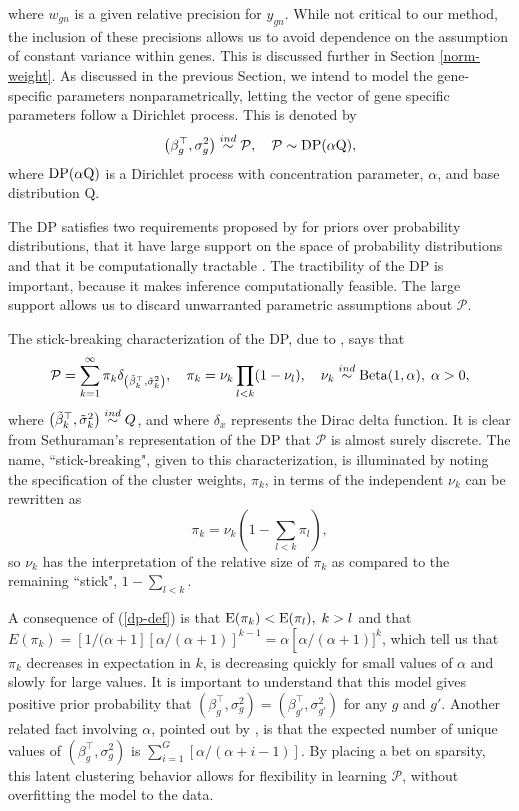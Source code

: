 where $w_{gn}$ is a given relative precision for $y_{gn}$. While not critical to our method, the inclusion of these precisions allows us to avoid dependence on the assumption of constant variance within genes. This is discussed further in Section \ref{norm-weight}. As discussed in the previous Section, we intend to model the gene-specific parameters nonparametrically, letting the vector of gene specific parameters follow a Dirichlet process. This is denoted by
\begin{equation}
\left(\beta_g^\top,\sigma^2_g\right) \stackrel{ind}{\sim} \mathcal{P},\quad \mathcal{P} \sim \operatorname{DP}(\alpha \mbox{Q}),
\end{equation}
where $\operatorname{DP}(\alpha \mbox{Q})$ is a Dirichlet process with concentration parameter, $\alpha$, and base distribution $\mbox{Q}$.

The DP satisfies two requirements proposed by \citet{ferguson} for priors over probability distributions, that it have large support on the space of probability distributions and that it be computationally tractable \citep{ferguson}. The tractibility of the DP is important, because it makes inference computationally feasible. The large support allows us to discard unwarranted parametric assumptions about $\mathcal{P}$.

The stick-breaking characterization of the DP, due to \citet{sethuraman}, says that 
\begin{equation}
\label{dp-def}
\mathcal{P} =\sum_{k=1}^\infty \pi_k \delta_{\left(\tilde{\beta}_k^\top ,\tilde{\sigma}^2_k\right)},\quad \pi_k = \nu_k \prod_{l<k}(1-\nu_l), \quad 
\nu_k \stackrel{ind}{\sim} \operatorname{Beta}(1, \alpha),\; \alpha>0,
\end{equation}
where $\left(\tilde{\beta}_k^\top ,\tilde{\sigma}^2_k\right) \stackrel{ind}{\sim} Q$, and where $\delta_{x}$ represents the Dirac delta function. It is clear from Sethuraman's representation of the DP that $\mathcal{P}$ is almost surely discrete. The name, ``stick-breaking", given to this characterization, is illuminated by noting the specification of the cluster weights, $\pi_k$, in terms of the independent $\nu_k$ can be rewritten as
\begin{equation}
\label{eq:pi}
\pi_k = \nu_k\left(1-\sum_{l<k}\pi_l\right),
\end{equation} so $\nu_k$ has the interpretation of the relative size of $\pi_k$ as compared to the remaining ``stick", $1-\sum_{l<k}$.

A consequence of (\ref{dp-def}) is that $\operatorname{E}(\pi_k)<\operatorname{E}(\pi_l),\;k>l$ and that $E(\pi_k)=\left[1/(\alpha+1\right]\left[\alpha/(\alpha+1)\right]^{k-1} = \alpha \left[\alpha/(\alpha+1)]^{k}$, which tell us that $\pi_k$ decreases in expectation in $k$, is decreasing quickly for small values of $\alpha$ and slowly for large values. It is important to understand that this model gives positive prior probability that $(\beta_g^\top,\sigma_g^2)=(\beta_{g'}^\top,\sigma_{g'}^2)$ for any $g$ and $g'$. Another related fact involving $\alpha$, pointed out by \citet[p. 1161]{antoniak}, is that the expected number of unique values of $(\beta_g^\top,\sigma^2_g)$ is $\sum_{i=1}^G \left[\alpha/(\alpha + i - 1)\right]$. By placing a bet on sparsity, this latent clustering behavior allows for flexibility in learning $\mathcal{P}$, without overfitting the model to the data.


